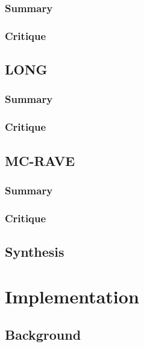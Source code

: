 \documentclass[letterpaper]{article}
\begin{document}
\subsubsection{Summary}

\subsubsection{Critique}

\subsection{LONG}

\subsubsection{Summary}

\subsubsection{Critique}


\subsection{MC-RAVE}

\subsubsection{Summary}

\subsubsection{Critique}

\subsection{Synthesis}

\section{Implementation}

\subsection{Background}
\end{document}
